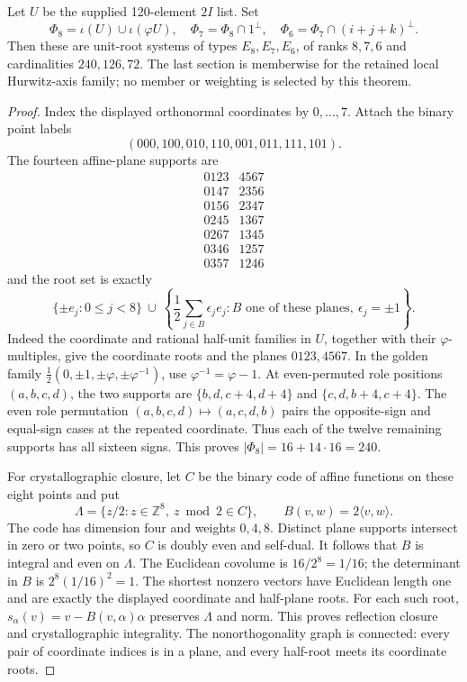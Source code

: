 \documentclass[11pt]{article}
\begin{document}
\begin{theorem}
\label{p1:thm:exroot-explicit-e876}
Let \(U\) be the supplied 120-element \(2I\) list. Set
\[
 \Phi_8=\iota(U)\cup\iota(\varphi U),\quad
 \Phi_7=\Phi_8\cap1^\perp,\quad
 \Phi_6=\Phi_7\cap(i+j+k)^\perp.
\]
Then these are unit-root systems of types \(E_8,E_7,E_6\), of ranks
\(8,7,6\) and cardinalities \(240,126,72\).
The last section is memberwise for the retained local Hurwitz-axis
family; no member or weighting is selected by this theorem.
\end{theorem}
\begin{proof}
Index the displayed orthonormal coordinates by \(0,\ldots,7\).
Attach the binary point labels
\[
 (000,100,010,110,001,011,111,101).
\]
The fourteen affine-plane supports are
\[
\begin{array}{c|c}
0123&4567\\
0147&2356\\
0156&2347\\
0245&1367\\
0267&1345\\
0346&1257\\
0357&1246
\end{array}
\]
and the root set is exactly
\[
 \{\pm e_j:0\leq j<8\}\ \cup\
 \left\{\frac12\sum_{j\in B}\epsilon_j e_j:
 B\text{ one of these planes},\ \epsilon_j=\pm1\right\}.
\]
Indeed the coordinate and rational half-unit families in \(U\), together
with their \(\varphi\)-multiples, give the coordinate roots and the
planes \(0123,4567\). In the golden family
\(\tfrac12(0,\pm1,\pm\varphi,\pm\varphi^{-1})\), use
\(\varphi^{-1}=\varphi-1\). At even-permuted role positions
\((a,b,c,d)\), the two supports are
\(\{b,d,c+4,d+4\}\) and \(\{c,d,b+4,c+4\}\).
The even role permutation \((a,b,c,d)\mapsto(a,c,d,b)\) pairs the
opposite-sign and equal-sign cases at the repeated coordinate. Thus each
of the twelve remaining supports has all sixteen signs. This proves
\(|\Phi_8|=16+14\cdot16=240\).

For crystallographic closure, let \(C\) be the binary code of affine
functions on these eight points and put
\[
 \Lambda=\{z/2:z\in\mathbb Z^8,\ z\bmod2\in C\},\qquad
 B(v,w)=2\langle v,w\rangle.
\]
The code has dimension four and weights \(0,4,8\). Distinct plane
supports intersect in zero or two points, so \(C\) is doubly even and
self-dual. It follows that \(B\) is integral and even on \(\Lambda\).
The Euclidean covolume is \(16/2^8=1/16\); the determinant in \(B\)
is \(2^8(1/16)^2=1\). The shortest nonzero vectors have Euclidean
length one and are exactly the displayed coordinate and half-plane
roots. For each such root,
\(s_\alpha(v)=v-B(v,\alpha)\alpha\) preserves \(\Lambda\) and norm.
This proves reflection closure and crystallographic integrality.
The nonorthogonality graph is connected: every pair of coordinate
indices is in a plane, and every half-root meets its coordinate roots.


\end{proof}
\end{document}
